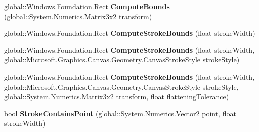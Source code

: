 \begin{DoxyCompactItemize}
\item 
\mbox{\label{interface_microsoft_1_1_graphics_1_1_canvas_1_1_geometry_1_1_i_canvas_geometry_a95cc7e7112718afb642f295a64915386}} 
global\+::\+Windows.\+Foundation.\+Rect {\bfseries Compute\+Bounds} (global\+::\+System.\+Numerics.\+Matrix3x2 transform)
\item 
\mbox{\label{interface_microsoft_1_1_graphics_1_1_canvas_1_1_geometry_1_1_i_canvas_geometry_a85348d384cde919169814908c2636f61}} 
global\+::\+Windows.\+Foundation.\+Rect {\bfseries Compute\+Stroke\+Bounds} (float stroke\+Width)
\item 
\mbox{\label{interface_microsoft_1_1_graphics_1_1_canvas_1_1_geometry_1_1_i_canvas_geometry_a9a080ab4d42be333c23db1f84a78c37b}} 
global\+::\+Windows.\+Foundation.\+Rect {\bfseries Compute\+Stroke\+Bounds} (float stroke\+Width, global\+::\+Microsoft.\+Graphics.\+Canvas.\+Geometry.\+Canvas\+Stroke\+Style stroke\+Style)
\item 
\mbox{\label{interface_microsoft_1_1_graphics_1_1_canvas_1_1_geometry_1_1_i_canvas_geometry_a79b506c76a36146c8bcf102953a9e348}} 
global\+::\+Windows.\+Foundation.\+Rect {\bfseries Compute\+Stroke\+Bounds} (float stroke\+Width, global\+::\+Microsoft.\+Graphics.\+Canvas.\+Geometry.\+Canvas\+Stroke\+Style stroke\+Style, global\+::\+System.\+Numerics.\+Matrix3x2 transform, float flattening\+Tolerance)
\item 
\mbox{\label{interface_microsoft_1_1_graphics_1_1_canvas_1_1_geometry_1_1_i_canvas_geometry_acdb5842e23cf49f65d75966833fcdeda}} 
bool {\bfseries Stroke\+Contains\+Point} (global\+::\+System.\+Numerics.\+Vector2 point, float stroke\+Width)
\item 
\mbox{\label{interface_microsoft_1_1_graphics_1_1_canvas_1_1_geometry_1_1_i_canvas_geometry_a749861cc7df09da3d826703f624d3aa2}} 

\end{DoxyCompactItemize}
